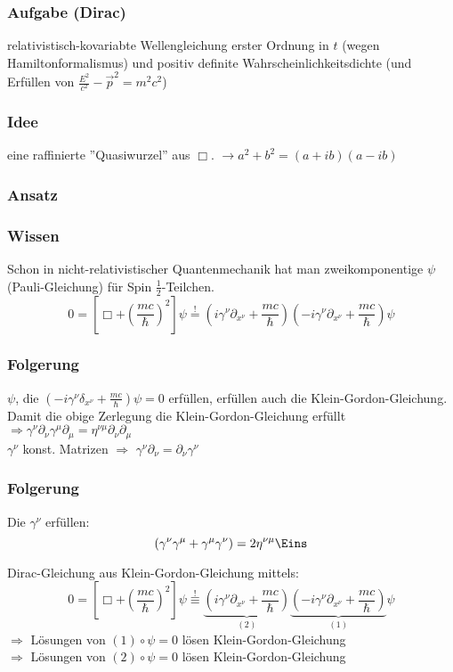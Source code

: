\documentclass[twoside,a4paper]{scrartcl}
\renewcommand{\1}{\mathds{1}}
\newcommand{\Ra}{\Rightarrow}
\newcommand{\ra}{\rightarrow}
\begin{document}
\subsubsection*{Aufgabe (Dirac)}
relativistisch-kovariabte Wellengleichung erster Ordnung in $t$ (wegen Hamiltonformalismus) und positiv definite Wahrscheinlichkeitsdichte (und Erfüllen von $\frac{E^2}{c^2}-\vec p^2=m^2c^2$)
\subsubsection*{Idee}
eine raffinierte ''Quasiwurzel'' aus $\Box$. $\ra a^2+b^2=(a+ib)(a-ib)$
\subsubsection*{Ansatz}
\subsubsection*{Wissen}
Schon in nicht-relativistischer Quantenmechanik hat man zweikomponentige $\psi$ (Pauli-Gleichung) für Spin $\frac{1}{2}$-Teilchen.
$$0=[\Box+(\frac{mc}{\hbar})^2]\psi\stackrel{!}{=} (i\gamma^\nu\partial_{x^\nu}+\frac{mc}{\hbar})(-i\gamma^\nu\partial_{x^\nu}+\frac{mc}{\hbar})\psi$$
\subsubsection*{Folgerung}
$\psi$, die $(-i\gamma^\nu\delta_{x^\nu}+\frac{mc}{\hbar})\psi=0$ erfüllen, erfüllen auch die Klein-Gordon-Gleichung.\\
Damit die obige Zerlegung die Klein-Gordon-Gleichung erfüllt $\Ra \gamma^\nu\partial_\nu \gamma^\mu \partial_\mu=\eta^{\nu \mu} \partial_\nu \partial_\mu$\\
$\gamma^\nu$ konst. Matrizen $\Ra$ $\gamma^\nu \partial_\nu=\partial_\nu \gamma^\nu$ 
\subsubsection*{Folgerung}
Die $\gamma^\nu$ erfüllen:
$$(\gamma^\nu\gamma^\mu+\gamma^\mu\gamma^\nu)=2 \eta^{\nu\mu}\Eins$$

% 

Dirac-Gleichung aus Klein-Gordon-Gleichung mittels:
$$0=[\Box+(\frac{mc}{\hbar})^2]\psi\stackrel{!}{\equiv}\underbrace{(i\gamma^\nu\partial_{x^\nu}+\frac{mc}{\hbar})}_{(2)}\underbrace{(-i\gamma^\nu\partial_{x^\nu}+\frac{mc}{\hbar})}_{(1)}\psi $$
$\Ra$ Lösungen von $(1)\circ \psi=0$ lösen Klein-Gordon-Gleichung\\
$\Ra$ Lösungen von $(2)\circ \psi=0$ lösen Klein-Gordon-Gleichung
\end{document}
